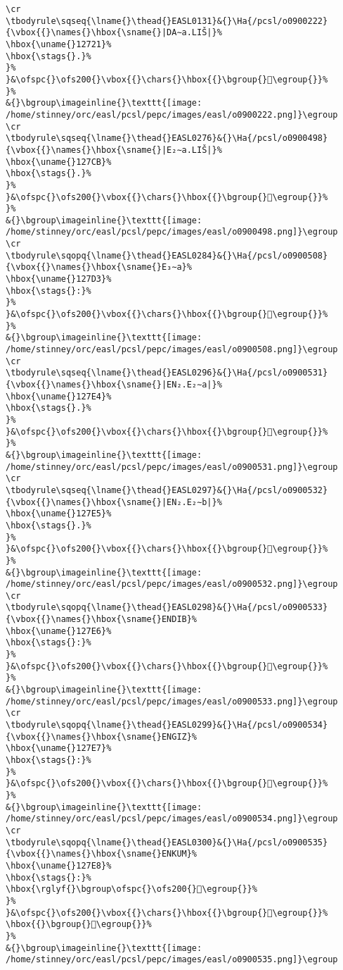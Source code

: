 \begin{verbatim}
\cr
\tbodyrule\sqseq{\lname{}\thead{}EASL0131}&{}\Ha{/pcsl/o0900222}{\vbox{{}\names{}\hbox{\sname{}|DA∼a.LIŠ|}%
\hbox{\uname{}12721}%
\hbox{\stags{}.}%
}%
}&\ofspc{}\ofs200{}\vbox{{}\chars{}\hbox{{}\bgroup{}𒜡\egroup{}}%
}%
&{}\bgroup\imageinline{}\texttt{[image: /home/stinney/orc/easl/pcsl/pepc/images/easl/o0900222.png]}\egroup
\cr
\tbodyrule\sqseq{\lname{}\thead{}EASL0276}&{}\Ha{/pcsl/o0900498}{\vbox{{}\names{}\hbox{\sname{}|E₂∼a.LIŠ|}%
\hbox{\uname{}127CB}%
\hbox{\stags{}.}%
}%
}&\ofspc{}\ofs200{}\vbox{{}\chars{}\hbox{{}\bgroup{}𒟋\egroup{}}%
}%
&{}\bgroup\imageinline{}\texttt{[image: /home/stinney/orc/easl/pcsl/pepc/images/easl/o0900498.png]}\egroup
\cr
\tbodyrule\sqopq{\lname{}\thead{}EASL0284}&{}\Ha{/pcsl/o0900508}{\vbox{{}\names{}\hbox{\sname{}E₃∼a}%
\hbox{\uname{}127D3}%
\hbox{\stags{}:}%
}%
}&\ofspc{}\ofs200{}\vbox{{}\chars{}\hbox{{}\bgroup{}𒟓\egroup{}}%
}%
&{}\bgroup\imageinline{}\texttt{[image: /home/stinney/orc/easl/pcsl/pepc/images/easl/o0900508.png]}\egroup
\cr
\tbodyrule\sqseq{\lname{}\thead{}EASL0296}&{}\Ha{/pcsl/o0900531}{\vbox{{}\names{}\hbox{\sname{}|EN₂.E₂∼a|}%
\hbox{\uname{}127E4}%
\hbox{\stags{}.}%
}%
}&\ofspc{}\ofs200{}\vbox{{}\chars{}\hbox{{}\bgroup{}𒟤\egroup{}}%
}%
&{}\bgroup\imageinline{}\texttt{[image: /home/stinney/orc/easl/pcsl/pepc/images/easl/o0900531.png]}\egroup
\cr
\tbodyrule\sqseq{\lname{}\thead{}EASL0297}&{}\Ha{/pcsl/o0900532}{\vbox{{}\names{}\hbox{\sname{}|EN₂.E₂∼b|}%
\hbox{\uname{}127E5}%
\hbox{\stags{}.}%
}%
}&\ofspc{}\ofs200{}\vbox{{}\chars{}\hbox{{}\bgroup{}𒟥\egroup{}}%
}%
&{}\bgroup\imageinline{}\texttt{[image: /home/stinney/orc/easl/pcsl/pepc/images/easl/o0900532.png]}\egroup
\cr
\tbodyrule\sqopq{\lname{}\thead{}EASL0298}&{}\Ha{/pcsl/o0900533}{\vbox{{}\names{}\hbox{\sname{}ENDIB}%
\hbox{\uname{}127E6}%
\hbox{\stags{}:}%
}%
}&\ofspc{}\ofs200{}\vbox{{}\chars{}\hbox{{}\bgroup{}𒟦\egroup{}}%
}%
&{}\bgroup\imageinline{}\texttt{[image: /home/stinney/orc/easl/pcsl/pepc/images/easl/o0900533.png]}\egroup
\cr
\tbodyrule\sqopq{\lname{}\thead{}EASL0299}&{}\Ha{/pcsl/o0900534}{\vbox{{}\names{}\hbox{\sname{}ENGIZ}%
\hbox{\uname{}127E7}%
\hbox{\stags{}:}%
}%
}&\ofspc{}\ofs200{}\vbox{{}\chars{}\hbox{{}\bgroup{}𒟧\egroup{}}%
}%
&{}\bgroup\imageinline{}\texttt{[image: /home/stinney/orc/easl/pcsl/pepc/images/easl/o0900534.png]}\egroup
\cr
\tbodyrule\sqopq{\lname{}\thead{}EASL0300}&{}\Ha{/pcsl/o0900535}{\vbox{{}\names{}\hbox{\sname{}ENKUM}%
\hbox{\uname{}127E8}%
\hbox{\stags{}:}%
\hbox{\rglyf{}\bgroup\ofspc{}\ofs200{}𒟨\egroup{}}%
}%
}&\ofspc{}\ofs200{}\vbox{{}\chars{}\hbox{{}\bgroup{}𒟨\egroup{}}%
\hbox{{}\bgroup{}𒟩\egroup{}}%
}%
&{}\bgroup\imageinline{}\texttt{[image: /home/stinney/orc/easl/pcsl/pepc/images/easl/o0900535.png]}\egroup

\end{verbatim}
